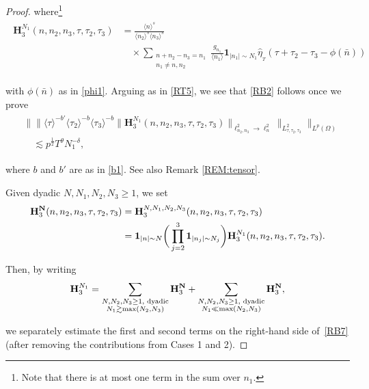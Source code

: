 \documentclass[%
11pt,  reqno]{amsart}
\newcommand{\1}{\hspace{0.2mm}\text{I}\hspace{0.2mm}}
\newcommand{\noi}{\noindent}
\newcommand{\dl}{\delta}
\newcommand{\ft}{\widehat}
\newcommand{\ta}{\theta}
\renewcommand{\l}{\ell}
\renewcommand{\O}{\Omega}
\newcommand{\les}{\lesssim}
\newcommand{\ges}{\gtrsim}
\newcommand{\jb}[1]
{\langle #1 \rangle}
\newcommand{\ind}{\mathbf 1}
\numberwithin{equation}{section}
\numberwithin{theorem}{section}
\newcommand{\Hb}{\mathbf{H}}
\begin{document}
\begin{proof}
\noi
where\footnote{Note that there is at most one term in the sum over $n_1$.} 
\begin{align}
\begin{split}
\Hb_3^{N_1} (n,n_2,n_3,\tau,\tau_2,\tau_3)  
& = 
\frac{\jb{n}^s}{\jb{n_2}^s \jb{n_3}^s} \\
& \quad \times  \sum_{\substack{n + n_2 - n_3 = n_1\\
n_1 \ne n,  n_2}}
\frac{g_{n_1}  }{\jb{n_1}}  \ind_{|n_1|\sim N_1}
 \ft \eta_{_T}  (\tau + \tau_2 - \tau_3 - \phi (\bar n))
\end{split}
\label{RB4}
\end{align}

\noi
with  $\phi (\bar n)$ as in \eqref{phi1}.
Arguing as in \eqref{RT5}, we see that \eqref{RB2}
follows once we prove 
\begin{align}
\begin{split}
& 
\Big\|
\big\|  \jb{\tau}^{-b'} \jb{\tau_2}^{-b} \jb{\tau_3}^{-b}
\| \Hb_3^{N_1}(n,n_2,n_3,\tau,\tau_2,\tau_3) \|_{\l^2_{n_2, n_3} \to \l^2_n}  \big\|_{L^2_{\tau,\tau_2,\tau_3}}
\Big\|_{L^p(\O)}\\
& \quad 
\les p^\frac 12   T^\ta N_1^{-\dl},  
\end{split}
\label{RB5}
\end{align}


\noi 
where $b$ and $b'$ are as in \eqref{b1}.  See also Remark \ref{REM:tensor}.

Given dyadic $N, N_1, N_2, N_3 \ge 1$, 
we set 
\begin{align}
\begin{split}
\Hb_3^{\bf N}(n,n_2,n_3,\tau,\tau_2,\tau_3)
& = 
\Hb_3^{N, N_1, N_2, N_3}(n,n_2,n_3,\tau,\tau_2,\tau_3)\\
& = \ind_{|n|\sim N}
\bigg(\prod_{j = 2}^3
\ind_{|n_j|\sim N_j}
\bigg)\Hb_3^{N_1}(n,n_2,n_3,\tau,\tau_2,\tau_3).
\end{split}
\label{RB6}
\end{align}



\noi
Then, by writing 
\begin{align}
\Hb_3^{N_1}
= 
\sum_{\substack{N, N_2, N_3 \ge 1, \text{ dyadic}\\ N_1 \ges \max (N_2, N_3)}} 
\Hb_3^{\bf N}
+ 
\sum_{\substack{N, N_2, N_3 \ge 1, \text{ dyadic}\\ N_1 \ll \max (N_2, N_3)}} 
\Hb_3^{\bf N}, 
\label{RB7}
\end{align}


\noi
 we separately estimate
the first and second terms on the right-hand side of~\eqref{RB7}
(after removing the contributions from Cases 1 and 2).


\end{proof}
\end{document}
